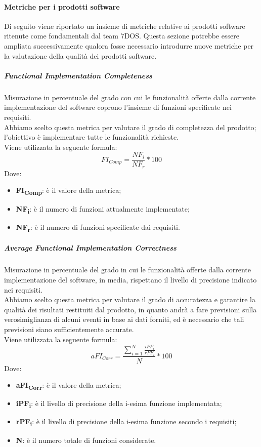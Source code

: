 \paragraph{Metriche per i prodotti software} \Spazio
Di seguito viene riportato un insieme di metriche relative ai prodotti software ritenute come fondamentali dal team 7DOS.
Questa sezione potrebbe essere ampliata successivamente qualora fosse necessario introdurre nuove metriche per la valutazione della qualità dei prodotti software.
\subparagraph{Functional Implementation Completeness}\Spazio
Misurazione in percentuale del grado con cui le funzionalità offerte dalla corrente implementazione del software coprono l'insieme di funzioni specificate nei requisiti.\\
Abbiamo scelto questa metrica per valutare il grado di completezza del prodotto; l'obiettivo è implementare tutte le funzionalità richieste.\\
Viene utilizzata la seguente formula:
$$FI_{Comp}=\frac{NF_i}{NF_r}*100$$
Dove:
\begin{itemize}
	\item{\textbf{FI\textsubscript{Comp}}: è il valore della metrica;}
	\item{\textbf{NF\textsubscript{i}}: è il numero di funzioni attualmente implementate;}
	\item{\textbf{NF\textsubscript{r}}: è il numero di funzioni specificate dai requisiti.}
\end{itemize}

\subparagraph{Average Functional Implementation Correctness}\Spazio
Misurazione in percentuale del grado in cui le funzionalità offerte dalla corrente implementazione del software, in media, rispettano il livello di precisione indicato nei requisiti.\\
Abbiamo scelto questa metrica per valutare il grado di accuratezza e garantire la qualità dei risultati restituiti dal prodotto, in quanto andrà a fare previsioni sulla verosimiglianza di alcuni eventi in base ai dati forniti, ed è necessario che tali previsioni siano sufficientemente accurate.\\
Viene utilizzata la seguente formula:
$$aFI_{Corr}=\frac{\sum\limits_{i=1}^N\frac{iPF_i}{rPF_i}}{N}*100$$
Dove:
\begin{itemize}
	\item{\textbf{aFI\textsubscript{Corr}}: è il valore della metrica;}
	\item{\textbf{iPF\textsubscript{i}}: è il livello di precisione della i-esima funzione implementata;}
	\item{\textbf{rPF\textsubscript{i}}: è il livello di precisione della i-esima funzione secondo i requisiti;}
	\item{\textbf{N}: è il numero totale di funzioni considerate.}
\end{itemize}

